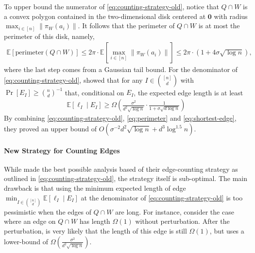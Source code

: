 \documentclass{theoretics}
\newcommand{\E}{\mathbb E}
\begin{document}
To upper bound the numerator of \eqref{eq:counting-strategy-old}, notice that $Q \cap W$ is a convex polygon contained in the two-dimensional disk centered at $\mathbf{0}$ with radius $\max_{i \in [n]}\|\pi_W(a_i)\|$. 
It follows that the perimeter of $Q \cap W$ is at most the perimeter of this disk, namely,
\begin{align}
    \E[\mathrm{perimeter}(Q \cap W)] \leq 2\pi \cdot \E[\max_{i \in [n]}\|\pi_W(a_i)\|] \leq 2\pi \cdot (1 + 4\sigma \sqrt{\log n}), \label{eq:perimeter}
\end{align}
where the last step comes from a Gaussian tail bound.
For the denominator of \eqref{eq:counting-strategy-old}, \cite{DH18} showed that for
any $I \in \binom{[n]}{d}$ with $\Pr[E_I] \geq \binom n d ^{-1}$ that, conditional on $E_I$, the expected edge length is at least
\begin{align}
    \E[\ell_I \mid E_I] \geq \Omega(\frac{\sigma^2}{d^2 \sqrt{\log n}} \cdot \frac{1}{1 + \sigma \sqrt{d \log n}}) \label{eq:shortest-edge}
\end{align}
By combining \eqref{eq:counting-strategy-old}, \eqref{eq:perimeter} and \eqref{eq:shortest-edge}, they proved an upper bound of $O(\sigma^{-2} d^2 \sqrt{\log n} + d^3 \log^{1.5}n)$.

\paragraph{New Strategy for Counting Edges}

While \cite{DH18} made the best possible analysis based of their edge-counting strategy as outlined in \eqref{eq:counting-strategy-old}, the strategy itself is sub-optimal.
The main drawback is that using the minimum expected length of edge $\min_{I \in \binom{[n]}{d}} \E[\ell_I \mid E_I]$ at the denominator of \eqref{eq:counting-strategy-old} is too pessimistic when the edges of $Q \cap W$ are long.
For instance, consider the case where an edge on $Q \cap W$ has length $\Omega(1)$ without perturbation. 
After the perturbation, is very likely that the length of this edge is still $\Omega(1)$, but \cite{DH18} uses a lower-bound of $\Omega(\frac{\sigma^2}{d^2 \sqrt{\log n}})$.
\end{document}
